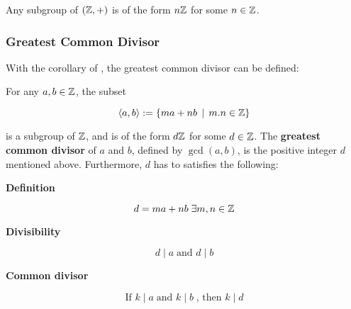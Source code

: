 \documentclass[a4paper,12pt]{article}
\begin{document}
\begin{crl}
  Any subgroup of $(\mathbb{Z},+)$ is of the form $n\mathbb{Z}$ for some $n\in\mathbb{Z}$.
\end{crl}

\subsubsection{Greatest Common Divisor}
With the corollary of \rpst[\sct], the greatest common divisor can be defined:\n

\begin{dft}
  For any $a,b\in\mathbb{Z}$, the subset

  $$\left\langle a,b\right\rangle:=\left\{ ma+nb\,\mid\, m.n\in\mathbb{Z}\right\}$$\s

  is a subgroup of $\mathbb{Z}$, and is of the form $d\mathbb{Z}$ for some $d\in\mathbb{Z}$. The \textbf{greatest common divisor} of $a$ and $b$, defined by $\gcd(a,b)$, is the positive integer $d$ mentioned above. Furthermore, $d$ has to satisfies the following:

  \begin{alist}
    \item \textbf{Definition}

    $$d=ma+nb\;\exists m,n\in\mathbb{Z}$$

    \item \textbf{Divisibility}

    $$d\mid a\;\text{and }d\mid b$$

    \item \textbf{Common divisor}

    $$\text{If }k\mid a\;\text{and }k\mid b\;\text{, then }k\mid d$$
  \end{alist}
\end{dft}\n
\end{document}
